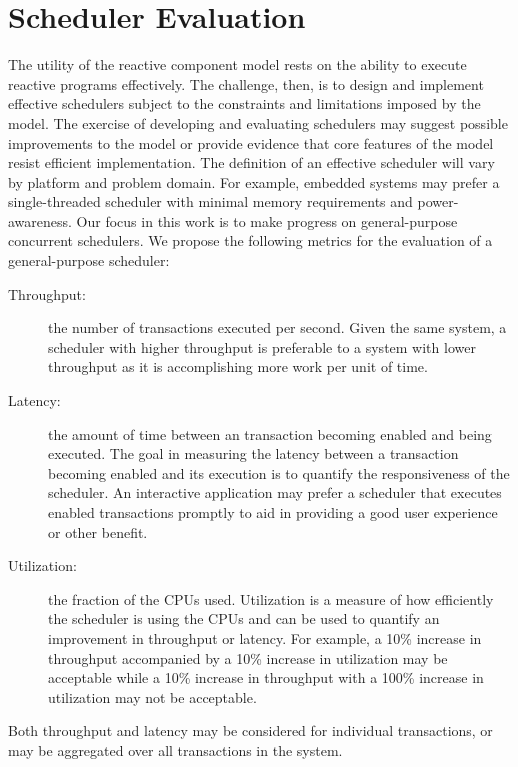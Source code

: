 \section{Scheduler Evaluation}

The utility of the reactive component model rests on the ability to execute reactive programs effectively.
The challenge, then, is to design and implement effective schedulers subject to the constraints and limitations imposed by the model.
The exercise of developing and evaluating schedulers may suggest possible improvements to the model or provide evidence that core features of the model resist efficient implementation.
The definition of an effective scheduler will vary by platform and problem domain.
For example, embedded systems may prefer a single-threaded scheduler with minimal memory requirements and power-awareness.
Our focus in this work is to make progress on general-purpose concurrent schedulers.
We propose the following metrics for the evaluation of a general-purpose scheduler:
\begin{description}
\item[Throughput:] the number of transactions executed per second.
Given the same system, a scheduler with higher throughput is preferable to a system with lower throughput as it is accomplishing more work per unit of time.
\item[Latency:] the amount of time between an transaction becoming enabled and being executed.
The goal in measuring the latency between a transaction becoming enabled and its execution is to quantify the responsiveness of the scheduler.
An interactive application may prefer a scheduler that executes enabled transactions promptly to aid in providing a good user experience or other benefit.
\item[Utilization:] the fraction of the CPUs used.
Utilization is a measure of how efficiently the scheduler is using the CPUs and can be used to quantify an improvement in throughput or latency.
For example, a 10\% increase in throughput accompanied by a 10\% increase in utilization may be acceptable while a 10\% increase in throughput with a 100\% increase in utilization may not be acceptable.
\end{description}
Both throughput and latency may be considered for individual transactions, or may be aggregated over all transactions in the system.

